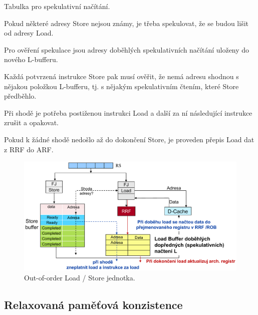 \begin{compactitem}
    \item Tabulka pro spekulativní načítání.

    \item Pokud některé adresy Store nejsou známy, je třeba spekulovat, že se budou lišit od adresy Load.

    \item Pro ověření spekulace jsou adresy doběhlých spekulativních načítání uloženy do nového L-bufferu.

    \item Každá potvrzená instrukce Store pak musí ověřit, že nemá adresu shodnou s nějakou položkou L-bufferu, tj. s nějakým spekulativním čtením, které Store předběhlo. \begin{compactitem}
        \item Při shodě je potřeba postiženou instrukci Load a další za ní následující instrukce zrušit a opakovat.
        \item Pokud k žádné shodě nedošlo až do dokončení Store, je proveden přepis Load dat z RRF do ARF.
    \end{compactitem}

    \begin{figure}[H]
        \centering
        \includegraphics[width=1\linewidth]{load_buffer.pdf}
        \caption{Out-of-order Load / Store jednotka.}
    \end{figure}
\end{compactitem}

\subsection{Relaxovaná paměťová konzistence}

